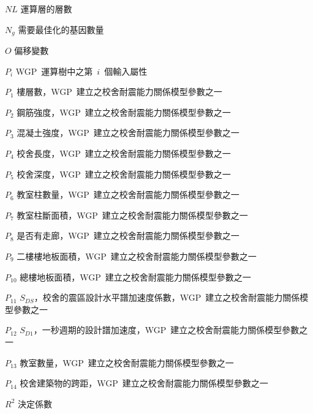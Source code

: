 \begin{SymEntry}
\item[$NL$]
運算層的層數

\item[$N_g$]
需要最佳化的基因數量

\item[$O$]
偏移變數

\item[$P_i$]
WGP~運算樹中之第~$i$~個輸入屬性

\item[$P_1$]
樓層數，WGP~建立之校舍耐震能力關係模型參數之一

\item[$P_2$]
鋼筋強度，WGP~建立之校舍耐震能力關係模型參數之一

\item[$P_3$]
混凝土強度，WGP~建立之校舍耐震能力關係模型參數之一

\item[$P_4$]
校舍長度，WGP~建立之校舍耐震能力關係模型參數之一

\item[$P_5$]
校舍深度，WGP~建立之校舍耐震能力關係模型參數之一

\item[$P_6$]
教室柱數量，WGP~建立之校舍耐震能力關係模型參數之一

\item[$P_7$]
教室柱斷面積，WGP~建立之校舍耐震能力關係模型參數之一

\item[$P_8$]
是否有走廊，WGP~建立之校舍耐震能力關係模型參數之一

\item[$P_9$]
二樓樓地板面積，WGP~建立之校舍耐震能力關係模型參數之一

\item[$P_{10}$]
總樓地板面積，WGP~建立之校舍耐震能力關係模型參數之一

\item[$P_{11}$]
$S_{DS}$，校舍的震區設計水平譜加速度係數，WGP~建立之校舍耐震能力關係模型參數之一

\item[$P_{12}$]
$S_{D1}$，一秒週期的設計譜加速度，WGP~建立之校舍耐震能力關係模型參數之一

\item[$P_{13}$]
教室數量，WGP~建立之校舍耐震能力關係模型參數之一

\item[$P_{14}$]
校舍建築物的跨距，WGP~建立之校舍耐震能力關係模型參數之一

\item[$R^2$]
決定係數


\end{SymEntry}
